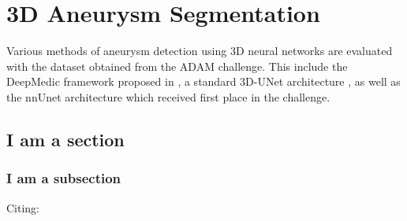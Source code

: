 \chapter{3D Aneurysm Segmentation}
Various methods of aneurysm detection using 3D neural networks are evaluated with the dataset obtained from the ADAM challenge. This include the DeepMedic framework proposed in \cite{Sichermann2019}, a standard 3D-UNet architecture \cite{3dunet}, as well as the nnUnet architecture  which received first place in the challenge.


\section{I am a section}



\subsection{I am a subsection}

Citing: \cite{Sample2016}


